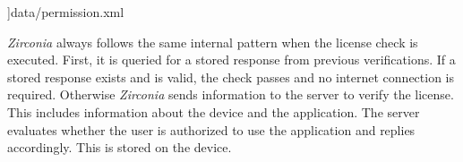]{data/permission.xml}


\textit{Zirconia} always follows the same internal pattern when the license check is executed.
First, it is queried for a stored response from previous verifications.
If a stored response exists and is valid, the check passes and no internet connection is required.
Otherwise \textit{Zirconia} sends information to the server to verify the license.
This includes information about the device and the application.
The server evaluates whether the user is authorized to use the application and replies accordingly.
This is stored on the device. \cite{samsungZirconia}
